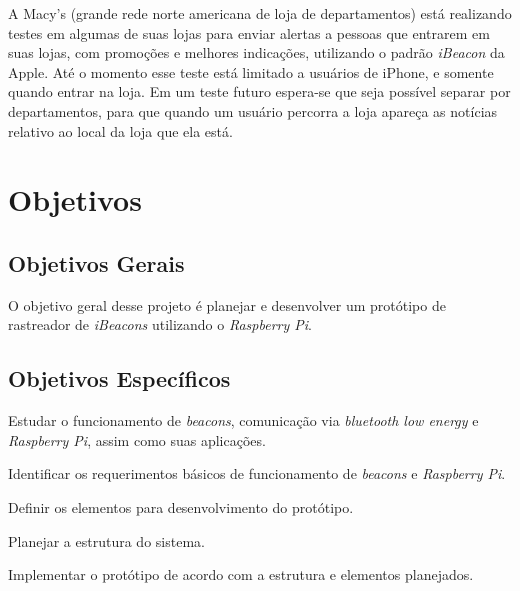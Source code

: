 \documentclass[
	12pt,				%
	openright,			%
	oneside,			%
	a4paper,			%
	chapter=TITLE,		%
	english,			%
	brazil				%
	]{abntex2}
\begin{document}
{A Macy's (grande rede norte americana de loja de departamentos) está realizando testes em algumas de suas lojas para enviar alertas a pessoas que entrarem em suas lojas, com promoções e melhores indicações, utilizando o padrão \textit{iBeacon} da Apple. Até o momento esse teste está limitado a usuários de iPhone, e somente quando entrar na loja. Em um teste futuro espera-se que seja possível separar por departamentos, para que quando um usuário percorra a loja apareça as notícias relativo ao local da loja que ela está. \cite{kastrenakes-macys-beacon}



\chapter{Objetivos}\label{cap:objetivos}

\section{Objetivos Gerais}

O objetivo geral desse projeto é planejar e desenvolver um protótipo de rastreador de \textit{iBeacons} utilizando o \textit{Raspberry Pi}.


\section{Objetivos Específicos}

\begin{alineas}
	\item Estudar o funcionamento de \textit{beacons}, comunicação via \textit{bluetooth low energy} e \textit{Raspberry Pi}, assim como suas aplicações.
	\item Identificar os requerimentos básicos de funcionamento de \textit{beacons} e \textit{Raspberry Pi}.
	\item Definir os elementos para desenvolvimento do protótipo.
	\item Planejar a estrutura do sistema.
	\item Implementar o protótipo de acordo com a estrutura e elementos planejados.
\end{alineas}

}
\end{document}
